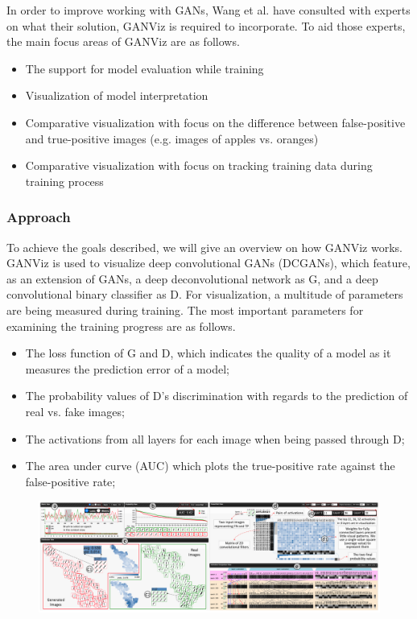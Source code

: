 \documentclass{acmsiggraph}               %
\begin{document}
In order to improve working with GANs, Wang et al. have consulted with experts on what their solution, GANViz is required to incorporate. To aid those experts, the main focus areas of GANViz are as follows.

\begin{itemize}
  \item The support for model evaluation while training
  \item Visualization of model interpretation
  \item Comparative visualization with focus on the difference between false-positive and true-positive images (e.g. images of apples vs. oranges)
  \item Comparative visualization with focus on tracking training data during training process
\end{itemize}

\subsubsection{Approach}
To achieve the goals described, we will give an overview on how GANViz works. GANViz is used to visualize deep convolutional GANs (DCGANs), which feature, as an extension of GANs, a deep deconvolutional network as G, and a deep convolutional binary classifier as D. For visualization, a multitude of parameters are being measured during training. The most important parameters for examining the training progress are as follows.

\begin{itemize}
  \item The loss function of G and D, which indicates the quality of a model as it measures the prediction error of a model;
  \item The probability values of D's discrimination with regards to the prediction of real vs. fake images;
  \item The activations from all layers for each image when being passed through D;
  \item The area under curve (AUC) which plots the true-positive rate against the false-positive rate;
\end{itemize}

\begin{figure}
  \centering
  \includegraphics[width=\textwidth]{ganviz}
  \caption{\protect\cite{Wang}}
  \label{fig:ganviz}
\end{figure}
\end{document}
